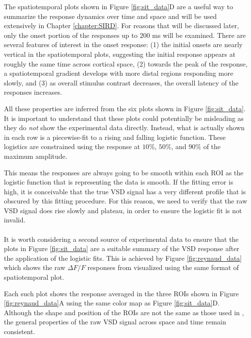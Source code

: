 \documentclass[phd,ianc,twoside]{infthesis}
\begin{document}
The spatiotemporal plots shown in Figure \ref{fig:sit_data}D are a
useful way to summarize the response dynamics over time and space and
will be used extensively in Chapter \ref{chapter:SIRD}. For reasons that
will be discussed later, only the onset portion of the responses up to
$200$ ms will be examined. There are several features of interest in the
onset response: (1) the initial onsets are nearly vertical in the
spatiotemporal plots, suggesting the initial response appears at roughly
the same time across cortical space, (2) towards the peak of the
response, a spatiotemporal gradient develops with more distal regions
responding more slowly, and (3) as overall stimulus contrast decreases, the
overall latency of the responses increases.

All these properties are inferred from the six plots shown in
Figure \ref{fig:sit_data}. It is important to understand that these
plots could potentially be misleading as they do \emph{not} show the
experimental data directly. Instead, what is actually shown in each row
is a piecewise-fit to a rising and falling logistic function. These
logistics are constrained using the response at $10\%$, $50\%$, and
$90\%$ of the maximum amplitude.

This means the responses are always going to be smooth within each ROI
as the logistic function that is representing the data is smooth. If the
fitting error is high, it is conceivable that the true VSD signal has a
very different profile that is obscured by this fitting procedure. For
this reason, we need to verify that the raw VSD signal does rise slowly
and plateau, in order to ensure the logistic fit is not invalid.

\paragraph*{\citet{reynaud_jn12}}

It is worth considering a second source of experimental data to ensure
that the plots in Figure \ref{fig:sit_data} are a suitable summary of
the VSD response after the application of the logistic fits. This is
achieved by Figure \ref{fig:reynaud_data} which shows the raw $\Delta
F/F$ responses from \citet{reynaud_jn12} visualized using the same
format of spatiotemporal plot.

Each such plot shows the response averaged in the three ROIs shown in
Figure \ref{fig:reynaud_data}A using the same color map as Figure
\ref{fig:sit_data}D. Although the shape and position of the ROIs are not
the same as those used in \citet{sit_neuron09}, the general properties
of the raw VSD signal across space and time remain consistent.
\end{document}

